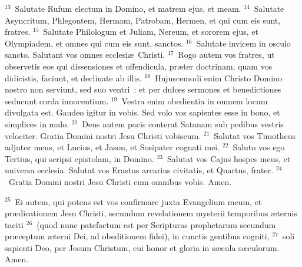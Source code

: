 ${}^{13}$~Salutate Rufum electum in Domino, et matrem ejus, et meam.
${}^{14}$~Salutate Asyncritum, Phlegontem, Hermam, Patrobam, Hermen, et qui cum eis sunt, fratres.
${}^{15}$~Salutate Philologum et Juliam, Nereum, et sororem ejus, et Olympiadem, et omnes qui cum eis sunt, sanctos.
${}^{16}$~Salutate invicem in osculo sancto. Salutant vos omnes ecclesi\ae\ Christi.
${}^{17}$~Rogo autem vos fratres, ut observetis eos qui dissensiones et offendicula, pr\ae ter doctrinam, quam vos didicistis, faciunt, et declinate ab illis.
${}^{18}$~Hujuscemodi enim Christo Domino nostro non serviunt, sed suo ventri~: et per dulces sermones et benedictiones seducunt corda innocentium.
${}^{19}$~Vestra enim obedientia in omnem locum divulgata est. Gaudeo igitur in vobis. Sed volo vos sapientes esse in bono, et simplices in malo.
${}^{20}$~Deus autem pacis conterat Satanam sub pedibus vestris velociter. Gratia Domini nostri Jesu Christi vobiscum.
${}^{21}$~Salutat vos Timotheus adjutor meus, et Lucius, et Jason, et Sosipater cognati mei.
${}^{22}$~Saluto vos ego Tertius, qui scripsi epistolam, in Domino.
${}^{23}$~Salutat vos Cajus hospes meus, et universa ecclesia. Salutat vos Erastus arcarius civitatis, et Quartus, frater.
${}^{24}$~Gratia Domini nostri Jesu Christi cum omnibus vobis. Amen.


${}^{25}$~Ei autem, qui potens est vos confirmare juxta Evangelium meum, et pr\ae dicationem Jesu Christi, secundum revelationem mysterii temporibus \ae ternis taciti
${}^{26}$~(quod nunc patefactum est per Scripturas prophetarum secundum pr\ae ceptum \ae terni Dei, ad obeditionem fidei), in cunctis gentibus cogniti,
${}^{27}$~soli sapienti Deo, per Jesum Christum, cui honor et gloria in s\ae cula s\ae culorum. Amen.
